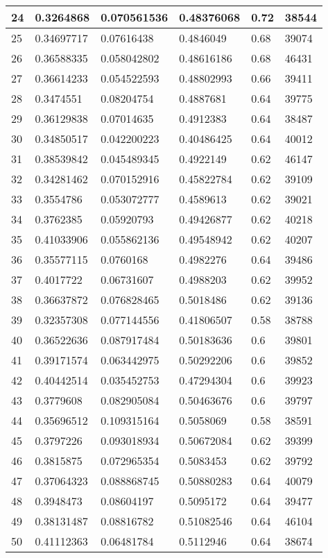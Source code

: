 \begin{longtable}{|l|l|l|l|l|l|}
24 & 0.3264868 & 0.070561536 & 0.48376068 & 0.72 & 38544 \\ \hline 
25 & 0.34697717 & 0.07616438 & 0.4846049 & 0.68 & 39074 \\ \hline 
26 & 0.36588335 & 0.058042802 & 0.48616186 & 0.68 & 46431 \\ \hline 
27 & 0.36614233 & 0.054522593 & 0.48802993 & 0.66 & 39411 \\ \hline 
28 & 0.3474551 & 0.08204754 & 0.4887681 & 0.64 & 39775 \\ \hline 
29 & 0.36129838 & 0.07014635 & 0.4912383 & 0.64 & 38487 \\ \hline 
30 & 0.34850517 & 0.042200223 & 0.40486425 & 0.64 & 40012 \\ \hline 
31 & 0.38539842 & 0.045489345 & 0.4922149 & 0.62 & 46147 \\ \hline 
32 & 0.34281462 & 0.070152916 & 0.45822784 & 0.62 & 39109 \\ \hline 
33 & 0.3554786 & 0.053072777 & 0.4589613 & 0.62 & 39021 \\ \hline 
34 & 0.3762385 & 0.05920793 & 0.49426877 & 0.62 & 40218 \\ \hline 
35 & 0.41033906 & 0.055862136 & 0.49548942 & 0.62 & 40207 \\ \hline 
36 & 0.35577115 & 0.0760168 & 0.4982276 & 0.64 & 39486 \\ \hline 
37 & 0.4017722 & 0.06731607 & 0.4988203 & 0.62 & 39952 \\ \hline 
38 & 0.36637872 & 0.076828465 & 0.5018486 & 0.62 & 39136 \\ \hline 
39 & 0.32357308 & 0.077144556 & 0.41806507 & 0.58 & 38788 \\ \hline 
40 & 0.36522636 & 0.087917484 & 0.50183636 & 0.6 & 39801 \\ \hline 
41 & 0.39171574 & 0.063442975 & 0.50292206 & 0.6 & 39852 \\ \hline 
42 & 0.40442514 & 0.035452753 & 0.47294304 & 0.6 & 39923 \\ \hline 
43 & 0.3779608 & 0.082905084 & 0.50463676 & 0.6 & 39797 \\ \hline 
44 & 0.35696512 & 0.109315164 & 0.5058069 & 0.58 & 38591 \\ \hline 
45 & 0.3797226 & 0.093018934 & 0.50672084 & 0.62 & 39399 \\ \hline 
46 & 0.3815875 & 0.072965354 & 0.5083453 & 0.62 & 39792 \\ \hline 
47 & 0.37064323 & 0.088868745 & 0.50880283 & 0.64 & 40079 \\ \hline 
48 & 0.3948473 & 0.08604197 & 0.5095172 & 0.64 & 39477 \\ \hline 
49 & 0.38131487 & 0.08816782 & 0.51082546 & 0.64 & 46104 \\ \hline 
50 & 0.41112363 & 0.06481784 & 0.5112946 & 0.64 & 38674 \\ \hline 
\end{longtable}
